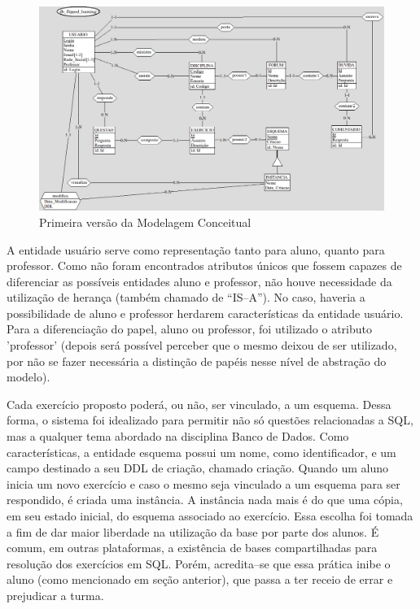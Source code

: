 \documentclass[graduacao,brazil]{ThesisPUC}
\begin{document}
\begin{figure}[H]
    \centering
    \includegraphics[width=\linewidth]{Imagens/ModelagemConceitual_v1_0.png}
    \caption{Primeira versão da Modelagem Conceitual}
\end{figure}

A entidade usu\'{a}rio serve como representa\c{c}\~{a}o tanto para aluno, quanto para professor.
Como n\~{a}o foram encontrados atributos \'{u}nicos que fossem capazes de diferenciar as poss\'{i}veis
entidades aluno e professor, n\~{a}o houve necessidade da utiliza\c{c}\~{a}o de heran\c{c}a (tamb\'{e}m chamado
de “IS--A”). No caso, haveria a possibilidade de aluno e professor herdarem caracter\'{i}sticas da
entidade usu\'{a}rio. Para a diferencia\c{c}\~{a}o do papel, aluno ou professor, foi utilizado o atributo
'professor' (depois ser\'{a} poss\'{i}vel perceber que o mesmo deixou de ser utilizado, por n\~{a}o se fazer
necess\'{a}ria a distin\c{c}\~{a}o de pap\'{e}is nesse n\'{i}vel de abstra\c{c}\~{a}o do modelo).

Cada exerc\'{i}cio proposto poder\'{a}, ou n\~{a}o, ser vinculado, a um esquema. Dessa forma, o
sistema foi idealizado para permitir n\~{a}o s\'{o} quest\~{o}es relacionadas a SQL, mas a qualquer tema
abordado na disciplina Banco de Dados. Como caracter\'{i}sticas, a entidade esquema possui um
nome, como identificador, e um campo destinado a seu DDL de cria\c{c}\~{a}o, chamado cria\c{c}\~{a}o.
Quando um aluno inicia um novo exerc\'{i}cio e caso o mesmo seja vinculado a um esquema
para ser respondido, \'{e} criada uma inst\^{a}ncia. A inst\^{a}ncia nada mais \'{e} do que uma c\'{o}pia, em seu
estado inicial, do esquema associado ao exerc\'{i}cio. Essa escolha foi tomada a fim de dar maior
liberdade na utiliza\c{c}\~{a}o da base por parte dos alunos. \'{E} comum, em outras plataformas, a
exist\^{e}ncia de bases compartilhadas para resolu\c{c}\~{a}o dos exerc\'{i}cios em SQL. Por\'{e}m, acredita--se
que essa pr\'{a}tica inibe o aluno (como mencionado em se\c{c}\~{a}o anterior), que passa a ter receio de
errar e prejudicar a turma.
\end{document}

